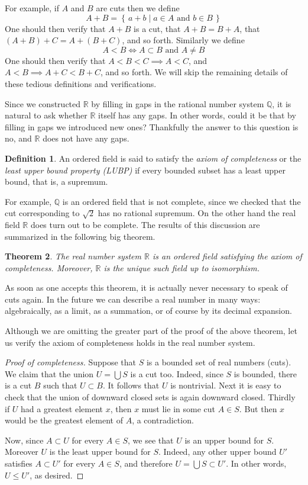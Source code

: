 \documentclass[11pt,oneside]{amsbook}
\newcommand{\set}[1]{\left\{\,#1\,\right\}}
\newcommand{\Q}{\mathbb Q}
\newcommand{\R}{\mathbb R}
\theoremstyle{definition}
\theoremstyle{plain}
\newtheorem{thm}{Theorem}[section]
\theoremstyle{definition}
\newtheorem{defn}[thm]{Definition}
\theoremstyle{remark}
\numberwithin{equation}{section}
\numberwithin{figure}{section}
\begin{document}
For example, if $A$ and $B$ are cuts then we define
\[A+B=\set{a+b\mid a\in A\text{ and }b\in B}
\]
One should then verify that $A+B$ is a cut, that $A+B=B+A$, that $(A+B)+C=A+(B+C)$, and so forth. Similarly we define
\[A<B\iff A\subset B\text{ and }A\neq B
\]
One should then verify that $A<B<C\implies A<C$, and $A<B\implies A+C<B+C$, and so forth. We will skip the remaining details of these tedious definitions and verifications.

Since we constructed $\R$ by filling in gaps in the rational number system $\Q$, it is natural to ask whether $\R$ itself has any gaps. In other words, could it be that by filling in gaps we introduced new ones? Thankfully the answer to this question is no, and $\R$ does not have any gaps.

\begin{defn}
  An ordered field is said to satisfy the \emph{axiom of completeness} or the \emph{least upper bound property (LUBP)} if every bounded subset has a least upper bound, that is, a supremum.
\end{defn}

For example, $\Q$ is an ordered field that is not complete, since we checked that the cut corresponding to $\sqrt2$ has no rational supremum. On the other hand the real field $\R$ does turn out to be complete. The results of this discussion are summarized in the following big theorem.

\begin{thm}
  The real number system $\R$ is an ordered field satisfying the axiom of completeness. Moreover, $\R$ is the unique such field up to isomorphism.
\end{thm}

As soon as one accepts this theorem, it is actually never necessary to speak of cuts again. In the future we can describe a real number in many ways: algebraically, as a limit, as a summation, or of course by its decimal expansion.

Although we are omitting the greater part of the proof of the above theorem, let us verify the axiom of completeness holds in the real number system.

\begin{proof}[Proof of completeness]
  Suppose that $S$ is a bounded set of real numbers (cuts). We claim that the union $U=\bigcup S$ is a cut too. Indeed, since $S$ is bounded, there is a cut $B$ such that  $U\subset B$. It follows that $U$ is nontrivial. Next it is easy to check that the union of downward closed sets is again downward closed. Thirdly if $U$ had a greatest element $x$, then $x$ must lie in some cut $A\in S$. But then $x$ would be the greatest element of $A$, a contradiction.

  Now, since $A\subset U$ for every $A\in S$, we see that $U$ is an upper bound for $S$. Moreover $U$ is the least upper bound for $S$. Indeed, any other upper bound $U'$ satisfies $A\subset U'$ for every $A\in S$, and therefore $U=\bigcup S\subset U'$. In other words, $U\leq U'$, as desired.
\end{proof}
\end{document}

